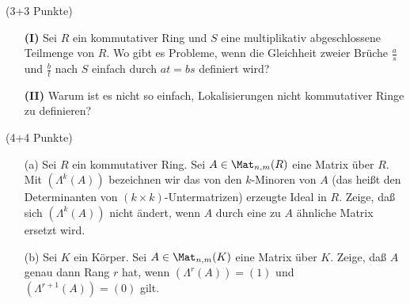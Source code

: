 \documentclass{algsheet}
\begin{document}
\newpage


\begin{exercise}(3+3 Punkte)\vspace{-1ex}
     \begin{itemize}
    \item [\textbf{(I)}]     Sei \(R\) ein kommutativer Ring und \(S\) eine multiplikativ abgeschlossene
    Teilmenge von \(R\). Wo gibt es Probleme, wenn die Gleichheit zweier
    Brüche \(\frac a s\) und \(\frac b t\) nach \(S\) einfach durch \(at = bs\)
    definiert wird?
    \item [\textbf{(II)}]  Warum ist es nicht so einfach, Lokalisierungen nicht kommutativer Ringe zu
    definieren?
   \end{itemize}
\end{exercise}







\begin{exercise}(4+4 Punkte)\vspace{-1ex}
\begin{itemize}
 \item [(a)] Sei \(R\) ein kommutativer Ring. Sei \(A \in \Mat_{n, m}(R)\) eine Matrix über
    \(R\). Mit \((\Lambda^k(A))\) bezeichnen wir das von den \(k\)-Minoren von
    \(A\) (das heißt den Determinanten von \((k \times k)\)-Untermatrizen)
    erzeugte Ideal in \(R\). Zeige, daß sich \((\Lambda^k(A))\) nicht ändert,
    wenn \(A\) durch eine zu \(A\) ähnliche Matrix ersetzt wird.
 \item [(b)] Sei \(K\) ein Körper. Sei \(A \in \Mat_{n, m}(K)\) eine Matrix über \(K\).
    Zeige, daß \(A\) genau dann Rang \(r\) hat, wenn \((\Lambda^r(A)) = (1)\)
    und \((\Lambda^{r + 1}(A)) = (0)\) gilt.
\end{itemize}
\end{exercise}
\end{document}
